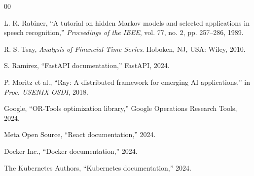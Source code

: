 \documentclass[conference]{IEEEtran}
\begin{document}
\begin{thebibliography}{00}

L. R. Rabiner, ``A tutorial on hidden Markov models and selected applications in speech recognition,'' \emph{Proceedings of the IEEE}, vol. 77, no. 2, pp. 257--286, 1989.

R. S. Tsay, \emph{Analysis of Financial Time Series}. Hoboken, NJ, USA: Wiley, 2010.

S. Ramirez, ``FastAPI documentation,'' FastAPI, 2024.

P. Moritz et al., ``Ray: A distributed framework for emerging AI applications,'' in \emph{Proc. USENIX OSDI}, 2018.

Google, ``OR-Tools optimization library,'' Google Operations Research Tools, 2024.

Meta Open Source, ``React documentation,'' 2024.

Docker Inc., ``Docker documentation,'' 2024.

The Kubernetes Authors, ``Kubernetes documentation,'' 2024.

\end{thebibliography}
\end{document}
